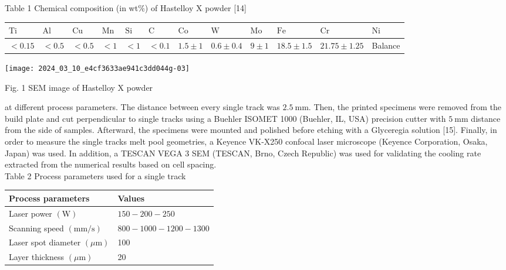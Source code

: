 \documentclass[10pt]{article}
\begin{document}
Table 1 Chemical composition (in wt\%) of Hastelloy X powder [14]

\begin{center}
\begin{tabular}{llllllllllll}
\hline
$\mathrm{Ti}$ & $\mathrm{Al}$ & $\mathrm{Cu}$ & $\mathrm{Mn}$ & $\mathrm{Si}$ & $\mathrm{C}$ & $\mathrm{Co}$ & $\mathrm{W}$ & $\mathrm{Mo}$ & $\mathrm{Fe}$ & $\mathrm{Cr}$ & $\mathrm{Ni}$ \\
\hline
$<0.15$ & $<0.5$ & $<0.5$ & $<1$ & $<1$ & $<0.1$ & $1.5 \pm 1$ & $0.6 \pm 0.4$ & $9 \pm 1$ & $18.5 \pm 1.5$ & $21.75 \pm 1.25$ & Balance \\
\hline
\end{tabular}
\end{center}

\begin{center}
\texttt{[image: 2024\_03\_10\_e4cf3633ae941c3dd044g-03]}
\end{center}

Fig. 1 SEM image of Hastelloy X powder

at different process parameters. The distance between every single track was $2.5 \mathrm{~mm}$. Then, the printed specimens were removed from the build plate and cut perpendicular to single tracks using a Buehler ISOMET 1000 (Buehler, IL, USA) precision cutter with $5 \mathrm{~mm}$ distance from the side of samples. Afterward, the specimens were mounted and polished before etching with a Glyceregia solution [15]. Finally, in order to measure the single tracks melt pool geometries, a Keyence VK-X250 confocal laser microscope (Keyence Corporation, Osaka, Japan) was used. In addition, a TESCAN VEGA 3 SEM (TESCAN, Brno, Czech Republic) was used for validating the cooling rate extracted from the numerical results based on cell spacing.\\
Table 2 Process parameters used for a single track

\begin{center}
\begin{tabular}{ll}
\hline
Process parameters & Values \\
\hline
Laser power $(\mathrm{W})$ & $150-200-250$ \\
Scanning speed $(\mathrm{mm} / \mathrm{s})$ & $800-1000-1200-1300$ \\
Laser spot diameter $(\mu \mathrm{m})$ & 100 \\
Layer thickness $(\mu \mathrm{m})$ & 20 \\
\hline
\end{tabular}
\end{center}
\end{document}

